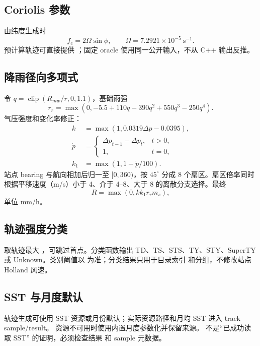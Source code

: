 \subsection{Coriolis 参数}
由纬度生成时
\begin{equation}
 f_c=2\Omega\sin\phi,\qquad \Omega=7.2921\times10^{-5}\ \mathrm{s}^{-1}.
\end{equation}
预计算轨迹可直接提供 ；固定 oracle 使用同一公开输入，不从 C++ 输出反推。

\subsection{降雨径向多项式}
令 $q=\operatorname{clip}(R_{mw}/r,0,1.1)$，基础雨强
\begin{equation}
 r_r=\max(0,-5.5+110q-390q^2+550q^3-250q^4).
\end{equation}
气压强度和变化率修正：
\begin{align}
 k&=\max(1,0.0319\Delta p-0.0395),\\
 \dot p&=\begin{cases}\Delta p_{t-1}-\Delta p_t,&t>0,\\1,&t=0,\end{cases}\\
 k_1&=\max(1,1-\dot p/100).
\end{align}
站点 bearing 与航向相加后归一至 $[0,360)$，按 $45^\circ$ 分成 8 个扇区。扇区倍率同时
根据平移速度（m/s）小于 4、介于 4--8、大于 8 的离散分支选择。最终
\begin{equation}
 R=\max(0,kk_1r_rm_s),
\end{equation}
单位 mm/h。

\subsection{轨迹强度分类}
 取轨迹最大 ，可跳过首点。分类函数输出
TD、TS、STS、TY、STY、SuperTY 或 Unknown。类别阈值以
 为准；分类结果只用于目录索引
和分组，不修改站点 Holland 风速。

\subsection{SST 与月度默认}
轨迹生成可使用 SST 资源或月份默认；实际资源路径和月均 SST 进入 track sample/result。
资源不可用时使用内置月度参数化并保留来源。 不是“已成功读取 SST”
的证明，必须检查结果  和 sample 元数据。

